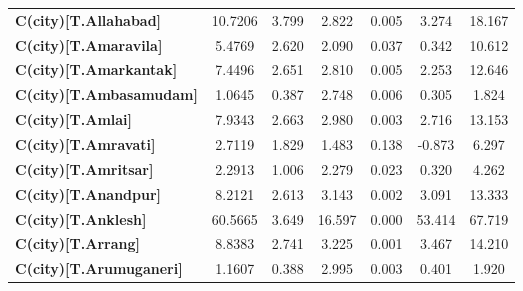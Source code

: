 \begin{center}
\begin{tabular}{lcccccc}
\textbf{C(city)[T.Allahabad]}                                                                       &      10.7206  &        3.799     &     2.822  &         0.005        &        3.274    &       18.167     \\
\textbf{C(city)[T.Amaravila]}                                                                       &       5.4769  &        2.620     &     2.090  &         0.037        &        0.342    &       10.612     \\
\textbf{C(city)[T.Amarkantak]}                                                                      &       7.4496  &        2.651     &     2.810  &         0.005        &        2.253    &       12.646     \\
\textbf{C(city)[T.Ambasamudam]}                                                                     &       1.0645  &        0.387     &     2.748  &         0.006        &        0.305    &        1.824     \\
\textbf{C(city)[T.Amlai]}                                                                           &       7.9343  &        2.663     &     2.980  &         0.003        &        2.716    &       13.153     \\
\textbf{C(city)[T.Amravati]}                                                                        &       2.7119  &        1.829     &     1.483  &         0.138        &       -0.873    &        6.297     \\
\textbf{C(city)[T.Amritsar]}                                                                        &       2.2913  &        1.006     &     2.279  &         0.023        &        0.320    &        4.262     \\
\textbf{C(city)[T.Anandpur]}                                                                        &       8.2121  &        2.613     &     3.143  &         0.002        &        3.091    &       13.333     \\
\textbf{C(city)[T.Anklesh]}                                                                         &      60.5665  &        3.649     &    16.597  &         0.000        &       53.414    &       67.719     \\
\textbf{C(city)[T.Arrang]}                                                                          &       8.8383  &        2.741     &     3.225  &         0.001        &        3.467    &       14.210     \\
\textbf{C(city)[T.Arumuganeri]}                                                                     &       1.1607  &        0.388     &     2.995  &         0.003        &        0.401    &        1.920     \\

\end{tabular}
\end{center}
